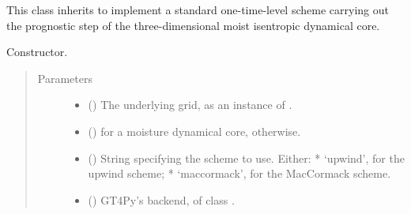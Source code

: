 \documentclass[letterpaper,10pt,english]{sphinxmanual}
\begin{document}

\begin{fulllineitems}
\label{\detokenize{api:dycore.isentropic_prognostic.OneTimeLevelIsentropicPrognostic}}
This class inherits {\hyperref[\detokenize{api:dycore.isentropic_prognostic.IsentropicPrognostic}]{}} to implement
a standard one-time-level scheme carrying out the prognostic step of the three-dimensional
moist isentropic dynamical core.

\begin{fulllineitems}
\label{\detokenize{api:dycore.isentropic_prognostic.OneTimeLevelIsentropicPrognostic.__init__}}
Constructor.
\begin{quote}\begin{description}
\item[{Parameters}] \leavevmode\begin{itemize}
\item {} 
 () \textendash{} The underlying grid, as an instance of {\hyperref[\detokenize{api:grids.xyz_grid.XYZGrid}]{}}.

\item {} 
 () \textendash{}  for a moisture dynamical core,  otherwise.

\item {} 
 () \textendash{} String specifying the scheme to use. Either:
* ‘upwind’, for the upwind scheme;
* ‘maccormack’, for the MacCormack scheme.

\item {} 
 () \textendash{} GT4Py’s backend, of class .

\end{itemize}


\end{description}
\end{quote}
\end{fulllineitems}
\end{fulllineitems}
\end{document}
